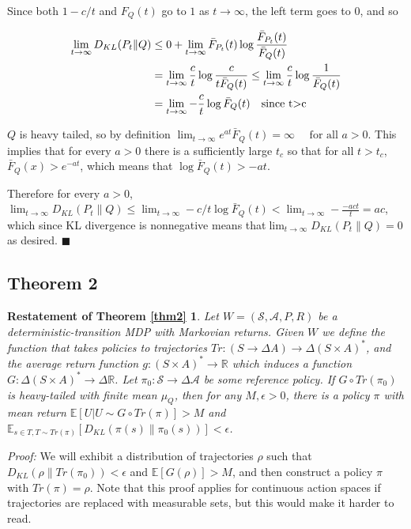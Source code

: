 \documentclass{article}
\begin{document}
Since both \(1-c/t\) and \(F_Q(t)\) go to \(1\) as \(t \to \infty\), the
left term goes to \(0\), and so

\begin{align*}\lim_{t \to \infty} D_{KL}(P_t \| Q)&\le 0 + \lim_{t \to \infty}\bar F_{P_t}(t) \log \frac{\bar F_{P_t}(t)
}{\bar F_Q(t)}
\\ & = \lim_{t \to \infty}\frac c t \log \frac c {t \bar F_Q(t)} \le \lim_{t \to \infty} \frac c t \log \frac 1 {\bar F_Q(t)} 
\\&= \lim_{t \to \infty}-\frac c t \log \bar F_Q(t) \text{\quad since t>c}
\end{align*}

\(Q\) is heavy tailed, so by definition
\(\lim _{t \rightarrow \infty} e^{a t} \bar{F}_Q(t)=\infty \quad \text { for all } a>0\).
This implies that for every \(a > 0\) there is a sufficiently large
\(t_{c}\) so that for all \(t > t_c\), \(\bar F_Q(x) > e^{-at}\), which
means that \(\log \bar F_Q(t) > -a t\).

Therefore for every \(a > 0\),
\(\lim_{t \to \infty} D_{KL}(P_t \| Q) \le \lim_{t \to \infty} -c/t \log \bar F_Q(t) < \lim_{t \to \infty} -\frac {-act} t = ac\),
which since KL divergence is nonnegative means
that\(\lim_{t \to \infty} D_{KL}(P_t \| Q) = 0\) as desired.
\(\blacksquare\)

\subsection{Theorem 2}
\newtheorem*{theorem2}{Restatement of Theorem \ref{thm2}}
\begin{theorem2}
Let \(W = (\mathcal S, \mathcal A, P, R)\) be
a deterministic-transition MDP with Markovian returns. Given \(W\) we
define the function that takes policies to trajectories
\(Tr: (S \to \Delta A) \to \Delta(S \times A)^*\), and the average
return function \(g: (S \times A)^* \to \mathbb R\) which induces a
function \(G: \Delta(S \times A)^* \to \Delta \mathbb R\). Let
\(\pi_0: \mathcal S \to \Delta \mathcal A\) be some reference policy. If
\(G \circ Tr(\pi_0)\) is heavy-tailed with finite mean \(\mu_Q\), then
for any \(M, \epsilon > 0\), there is a policy \(\pi\) with mean return
\(\mathbb E[U | U \sim G \circ Tr(\pi)] > M\) and
\(\mathbb E_{s \in T, T\sim Tr(\pi)}[D_{KL}(\pi(s) \| \pi_0(s))] < \epsilon\).
\end{theorem2}

\emph{Proof:} We will exhibit a distribution of trajectories \(\rho\)
such that \(D_{KL}(\rho \| Tr(\pi_0)) < \epsilon\) and
\(\mathbb E[G(\rho)] > M\), and then construct a policy \(\pi\) with
\(Tr(\pi) = \rho\). Note that this proof applies for continuous action
spaces if trajectories are replaced with measurable sets, but this would
make it harder to read.
\end{document}
